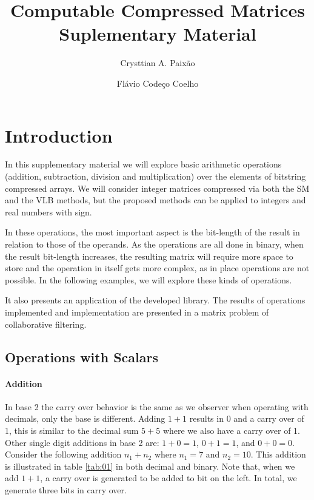\documentclass[10pt]{article}
\title{Computable Compressed Matrices\\Suplementary Material}
\author{Crysttian A. Paixão \and Flávio Codeço Coelho}
\begin{document}
\maketitle

\section{Introduction}

In this supplementary material we will explore basic arithmetic operations
(addition, subtraction, division and multiplication) over the elements of
bitstring compressed arrays. We will consider integer matrices compressed via
both the SM and the VLB methods,  but the proposed 
methods can be applied to integers and real numbers with sign.

In these operations, the most important aspect is the bit-length of the result
in relation to those of the operands. As the operations are all done in
binary, when the result bit-length increases, the resulting matrix will require
more space to store and the operation in itself gets more complex, as in place
operations are not possible. In the following examples, we will explore these
kinds of operations.

It also presents an application of the developed library. The results of 
operations implemented and implementation are presented in a matrix problem of 
collaborative filtering.

\subsection{Operations with Scalars}

\paragraph{Addition}

In base 2 the carry over behavior is the same as we observer when operating
with decimals, only the base is different. Adding $1+1$ results in $0$ and a
carry over of 1, this is similar to the decimal sum $5+5$ where we also have a
carry over of 1. Other single digit additions in base 2 are: $1 + 0
= 1$, $0 + 1 = 1$, and $0 + 0 = 0$. Consider the following addition $n_1+n_2$
where $n_1=7$ and $n_2=10$. This addition is illustrated in table \ref{tab:01}
in both decimal and binary. Note that, when we add $1+1$, a carry over is
generated to be added to bit on the left. In total, we generate three bits in
carry over.
\end{document}
